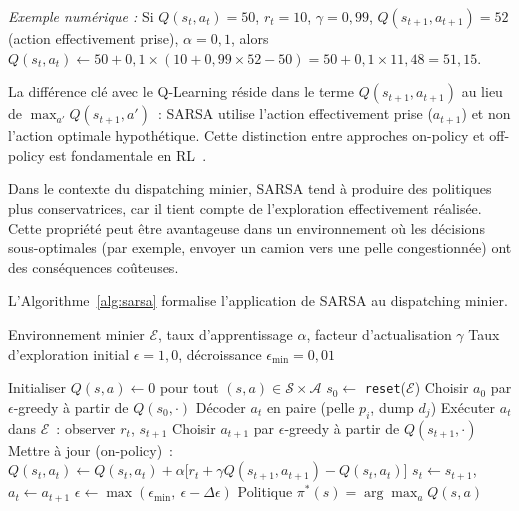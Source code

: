 \documentclass[11pt,a4paper]{report}
\begin{document}
\textit{Exemple numérique :} Si $Q(s_t, a_t) = 50$, $r_t = 10$, $\gamma = 0{,}99$, $Q(s_{t+1}, a_{t+1}) = 52$ (action effectivement prise), $\alpha = 0{,}1$, alors $Q(s_t, a_t) \leftarrow 50 + 0{,}1 \times (10 + 0{,}99 \times 52 - 50) = 50 + 0{,}1 \times 11{,}48 = 51{,}15$.

La différence clé avec le Q-Learning réside dans le terme $Q(s_{t+1}, a_{t+1})$ au lieu de $\max_{a'} Q(s_{t+1}, a')$~: SARSA utilise l'action effectivement prise ($a_{t+1}$) et non l'action optimale hypothétique. Cette distinction entre approches on-policy et off-policy est fondamentale en RL~\cite{SuttonBarto2018}.

Dans le contexte du dispatching minier, SARSA tend à produire des politiques plus conservatrices, car il tient compte de l'exploration effectivement réalisée. Cette propriété peut être avantageuse dans un environnement où les décisions sous-optimales (par exemple, envoyer un camion vers une pelle congestionnée) ont des conséquences coûteuses.

L'Algorithme~\ref{alg:sarsa} formalise l'application de SARSA au dispatching minier.

\begin{algorithm}[H]
\caption{SARSA pour le dispatching minier}
\label{alg:sarsa}
\begin{algorithmic}[1]

\REQUIRE Environnement minier $\mathcal{E}$, taux d'apprentissage $\alpha$, facteur d'actualisation $\gamma$
\REQUIRE Taux d'exploration initial $\epsilon = 1{,}0$, décroissance $\epsilon_{\min} = 0{,}01$

\STATE Initialiser $Q(s, a) \leftarrow 0$ pour tout $(s, a) \in \mathcal{S} \times \mathcal{A}$
    \STATE $s_0 \leftarrow$ \texttt{reset}($\mathcal{E}$) 
    \STATE Choisir $a_0$ par $\epsilon$-greedy à partir de $Q(s_0, \cdot)$
        \STATE Décoder $a_t$ en paire (pelle $p_i$, dump $d_j$)
        \STATE Exécuter $a_t$ dans $\mathcal{E}$~: observer $r_t$, $s_{t+1}$
        \STATE Choisir $a_{t+1}$ par $\epsilon$-greedy à partir de $Q(s_{t+1}, \cdot)$
        \STATE Mettre à jour (on-policy)~:
        \STATE \hspace{1em} $Q(s_t, a_t) \leftarrow Q(s_t, a_t) + \alpha \big[ r_t + \gamma Q(s_{t+1}, a_{t+1}) - Q(s_t, a_t) \big]$
        \STATE $s_t \leftarrow s_{t+1}$, \quad $a_t \leftarrow a_{t+1}$
    \ENDWHILE
    \STATE $\epsilon \leftarrow \max(\epsilon_{\min},\ \epsilon - \Delta\epsilon)$ 
\ENDFOR
\RETURN Politique $\pi^*(s) = \arg\max_a Q(s, a)$

\end{algorithmic}
\end{algorithm}
\end{document}

